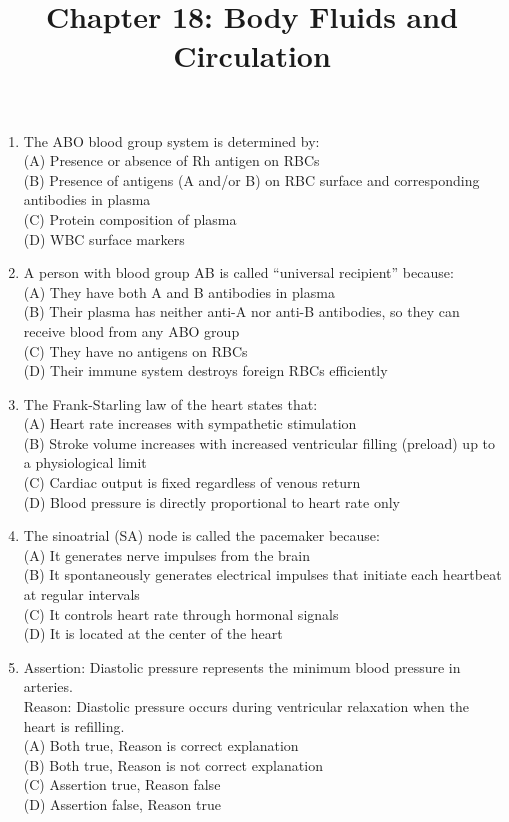 \documentclass{article}
\begin{document}
\title{Chapter 18: Body Fluids and Circulation}
\date{}
\maketitle

\begin{enumerate}[label=Q\arabic*.]

\item The ABO blood group system is determined by:
\\(A) Presence or absence of Rh antigen on RBCs
\\(B) Presence of antigens (A and/or B) on RBC surface and corresponding antibodies in plasma
\\(C) Protein composition of plasma
\\(D) WBC surface markers

\item A person with blood group AB is called ``universal recipient'' because:
\\(A) They have both A and B antibodies in plasma
\\(B) Their plasma has neither anti-A nor anti-B antibodies, so they can receive blood from any ABO group
\\(C) They have no antigens on RBCs
\\(D) Their immune system destroys foreign RBCs efficiently

\item The Frank-Starling law of the heart states that:
\\(A) Heart rate increases with sympathetic stimulation
\\(B) Stroke volume increases with increased ventricular filling (preload) up to a physiological limit
\\(C) Cardiac output is fixed regardless of venous return
\\(D) Blood pressure is directly proportional to heart rate only

\item The sinoatrial (SA) node is called the pacemaker because:
\\(A) It generates nerve impulses from the brain
\\(B) It spontaneously generates electrical impulses that initiate each heartbeat at regular intervals
\\(C) It controls heart rate through hormonal signals
\\(D) It is located at the center of the heart

\item Assertion: Diastolic pressure represents the minimum blood pressure in arteries.\\
Reason: Diastolic pressure occurs during ventricular relaxation when the heart is refilling.
\\(A) Both true, Reason is correct explanation
\\(B) Both true, Reason is not correct explanation
\\(C) Assertion true, Reason false
\\(D) Assertion false, Reason true


\end{enumerate}
\end{document}
